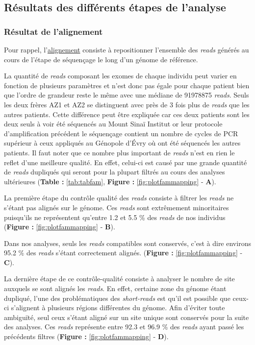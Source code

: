 \documentclass[12pt,twoside]{reedthesis}
\theoremstyle{definition}
\theoremstyle{definition}
\theoremstyle{remark}
\begin{document}
  \newpage 
  
  \subsection{Résultats des différents étapes de
  l'analyse}\label{resultats-des-differents-etapes-de-lanalyse}
  
  \subsubsection{Résultat de l'alignement}\label{resultat-de-lalignement}
  
  Pour rappel, l'\href{\%7B\#lalignement\%7D}{alignement} consiste à
  repositionner l'ensemble des \emph{reads} générés au cours de l'étape de
  séquençage le long d'un génome de référence.
  
  La quantité de \emph{reads} composant les exomes de chaque individu peut
  varier en fonction de plusieurs paramètres et n'est donc pas égale pour
  chaque patient bien que l'ordre de grandeur reste le même avec une
  médiane de 91978875 \emph{reads}. Seuls les deux frères AZ1 et AZ2 se
  distinguent avec près de 3 fois plus de \emph{reads} que les autres
  patients. Cette différence peut être expliquée car ces deux patients
  sont les deux seuls à voir été séquencés au Mount Sinaï Institut or leur
  protocole d'amplification précédent le séquençage contient un nombre de
  cycles de PCR supérieur à ceux appliqués au Génopole d'Évry où ont été
  séquencés les autres patients. Il faut noter que ce nombre plus
  important de \emph{reads} n'est en rien le reflet d'une meilleure
  qualité. En effet, celui-ci est causé par une grande quantité de
  \emph{reads} dupliqués qui seront pour la plupart filtrés au cours des
  analyses ultérieures (\textbf{Table :} \ref{tab:tabfam}, \textbf{Figure
  : }\ref{fig:plotfammapping} - \textbf{A}).
  
  La première étape du contrôle qualité des \emph{reads} consiste à
  filtrer les \emph{reads} ne s'étant pas alignés sur le génome. Ces
  \emph{reads} sont extrêmement minoritaires puisqu'ils ne représentent
  qu'entre 1.2 et 5.5 \% des \emph{reads} de nos individus (\textbf{Figure
  : }\ref{fig:plotfammapping} - \textbf{B}).
  
  Dans nos analyses, seuls les \emph{reads} compatibles sont conservés,
  c'est à dire environs 95.2 \% des \emph{reads} s'étant correctement
  alignés. (\textbf{Figure : }\ref{fig:plotfammapping} - \textbf{C}).
  
  La dernière étape de ce contrôle-qualité consiste à analyser le nombre
  de site auxquels se sont alignés les \emph{reads}. En effet, certaine
  zone du génome étant dupliqué, l'une des problématiques des
  \emph{short-reads} est qu'il est possible que ceux-ci s'alignent à
  plusieurs régions différentes du génome. Afin d'éviter toute ambiguïté,
  seul ceux s'étant aligné sur un site unique sont conservés pour la suite
  des analyses. Ces \emph{reads} représente entre 92.3 et 96.9 \% des
  \emph{reads} ayant passé les précédents filtres (\textbf{Figure :
  }\ref{fig:plotfammapping} - \textbf{D}).
  
\end{document}
